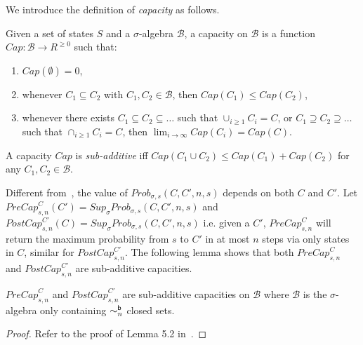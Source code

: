 \documentclass{LMCS}
\newcommand{\iBSB}[1]{\sim_{#1}^{{\sf b}}}
\newcommand{\MC}[1]{\mathcal{#1}}
\newcommand{\MI}[1]{\mathit{#1}}
\newcommand{\MEASURE}{\mathit{Prob}}
\newcommand{\MEASUREONE}{\mathit{PreCap}}
\newcommand{\MEASURETWO}{\mathit{PostCap}}
\newcommand{\SUP}{\mathit{Sup}}
\begin{document}
We introduce the definition of \emph{capacity} as follows.
\begin{defi}\label{def:capacity}
  Given a set of states $S$ and a $\sigma$-algebra $\MC{B}$, a
  capacity on $\MC{B}$ is a function $\MI{Cap}:\MC{B}\rightarrow
  R^{\ge 0}$ such that:
\begin{enumerate}[(1)]
\item $\MI{Cap}(\emptyset)=0$,
\item whenever $C_1\subseteq C_2$ with $C_1,C_2\in\MC{B}$, then
  $\MI{Cap}(C_1)\leq\MI{Cap}(C_2)$,
\item whenever there exists $C_1\subseteq C_2\subseteq\ldots$ such that $\cup_{i\geq 1}C_i=C$, or $C_1\supseteq C_2\supseteq\ldots$ such that $\cap_{i\geq 1}C_i=C$, then $\lim_{i\rightarrow\infty}\MI{Cap}(C_i)=\MI{Cap}(C)$.
\end{enumerate}
A capacity $\MI{Cap}$ is \emph{sub-additive} iff $\MI{Cap}(C_1\cup C_2)\leq\MI{Cap}(C_1) + \MI{Cap}(C_2)$ for any $C_1,C_2\in\MC{B}$.
\end{defi}

Different from~\cite{DesharnaisGJP10}, the value of $\MEASURE_{\sigma,s}(C,C',n,s)$ depends on both $C$ and $C'$. Let $\MEASUREONE_{s,n}^{C}(C')=\SUP_{\sigma}\MEASURE_{\sigma,s}(C,C',n,s)$ and $\MEASURETWO_{s,n}^{C'}(C)=\SUP_{\sigma}\MEASURE_{\sigma,s}(C,C',n,s)$ i.e. given a $C'$, $\MEASUREONE_{s,n}^C$ will return the maximum probability from $s$ to $C'$ in at most $n$ steps via only states in $C$, similar for $\MEASURETWO_{s,n}^{C'}$. The following lemma shows that both $\MEASUREONE_{s,n}^{C}$ and $\MEASURETWO_{s,n}^{C'}$ are sub-additive capacities.
\begin{lem}\label{lem:capacity}
$\MEASUREONE_{s,n}^{C}$ and $\MEASURETWO_{s,n}^{C'}$ are sub-additive capacities on $\MC{B}$ where $\MC{B}$ is the $\sigma$-algebra only containing $\iBSB{n}$ closed sets.
\end{lem}
\begin{proof}
Refer to the proof of Lemma 5.2 in~\cite{DesharnaisGJP10}.
\end{proof}
\end{document}
